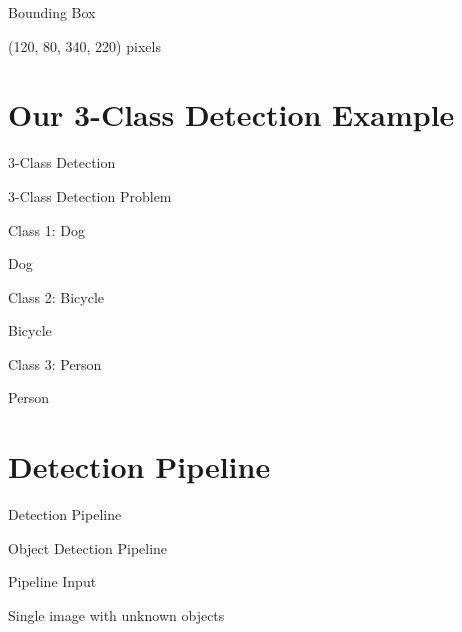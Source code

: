 \documentclass[usenames,dvipsnames]{beamer}
\begin{document}
	\begin{frame}{Bounding Box}
		\begin{center}
		\Large (120, 80, 340, 220) pixels
		\end{center}
	\end{frame}
	
	\section{Our 3-Class Detection Example}
	
	\begin{frame}{3-Class Detection}
		\begin{center}
		\Large 3-Class Detection Problem
		\end{center}
	\end{frame}
	
	\begin{frame}{Class 1: Dog}
		\begin{center}
		\Large Dog
		\end{center}
	\end{frame}
	
	\begin{frame}{Class 2: Bicycle}
		\begin{center}
		\Large Bicycle
		\end{center}
	\end{frame}
	
	\begin{frame}{Class 3: Person}
		\begin{center}
		\Large Person
		\end{center}
	\end{frame}
	
	\section{Detection Pipeline}
	
	\begin{frame}{Detection Pipeline}
		\begin{center}
		\Large Object Detection Pipeline
		\end{center}
	\end{frame}
	
	\begin{frame}{Pipeline Input}
		\begin{center}
		\Large Single image with unknown objects
		\end{center}
	\end{frame}
	
\end{document}
